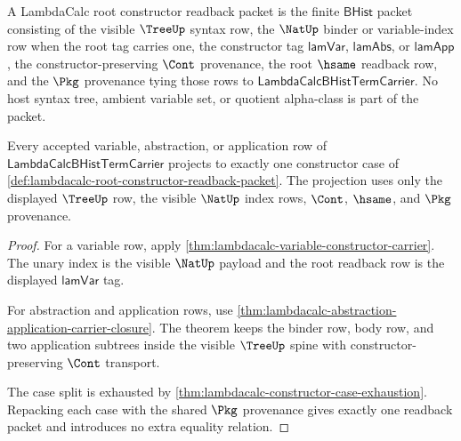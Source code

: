 \begin{definition}
\label{def:lambdacalc-root-constructor-readback-packet}
A LambdaCalc root constructor readback packet is the finite $\mathsf{BHist}$
packet consisting of the visible $\TreeUp$ syntax row, the $\NatUp$ binder or
variable-index row when the root tag carries one, the constructor tag
$\mathsf{lamVar}$, $\mathsf{lamAbs}$, or $\mathsf{lamApp}$, the
constructor-preserving $\Cont$ provenance, the root $\hsame$ readback row, and
the $\Pkg$ provenance tying those rows to
$\mathsf{LambdaCalcBHistTermCarrier}$. No host syntax tree, ambient variable
set, or quotient alpha-class is part of the packet.
\end{definition}

\begin{theorem}
\label{thm:lambdacalc-root-constructor-readback-exhaustion}
Every accepted variable, abstraction, or application row of
$\mathsf{LambdaCalcBHistTermCarrier}$ projects to exactly one constructor case
of \autoref{def:lambdacalc-root-constructor-readback-packet}. The projection
uses only the displayed $\TreeUp$ row, the visible $\NatUp$ index rows,
$\Cont$, $\hsame$, and $\Pkg$ provenance.
\end{theorem}
\begin{proof}
For a variable row, apply
\autoref{thm:lambdacalc-variable-constructor-carrier}. The unary index is the
visible $\NatUp$ payload and the root readback row is the displayed
$\mathsf{lamVar}$ tag.

For abstraction and application rows, use
\autoref{thm:lambdacalc-abstraction-application-carrier-closure}. The theorem
keeps the binder row, body row, and two application subtrees inside the
visible $\TreeUp$ spine with constructor-preserving $\Cont$ transport.

The case split is exhausted by
\autoref{thm:lambdacalc-constructor-case-exhaustion}. Repacking each case with
the shared $\Pkg$ provenance gives exactly one readback packet and introduces
no extra equality relation.
\end{proof}

